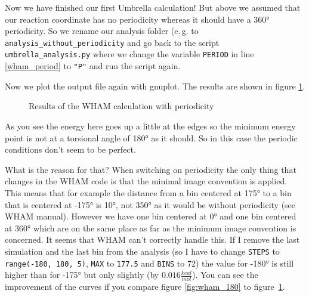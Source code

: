 \documentclass[a4paper,11pt]{scrartcl}
\begin{document}
Now we have finished our first Umbrella calculation! But above we assumed that our reaction coordinate has no periodicity whereas it should have a 360° periodicity. So we rename our analysis folder (e.\,g. to \texttt{analysis\_without\_periodicity} and go back to the script \texttt{umbrella\_analysis.py} where we change the variable \texttt{PERIOD} in line \ref{wham_period} to \texttt{"P"} and run the script again.

Now we plot the output file again with gnuplot. The results are shown in figure \ref{fig:wham_result_period}.

\begin{figure} [htb]
	\caption{Results of the WHAM calculation with periodicity}
	\label{fig:wham_result_period}
\end{figure} 

As you see the energy here goes up a little at the edges so the minimum energy point is not at a torsional angle of 180° as it should. So in this case the periodic conditions don't seem to be perfect.

What is the reason for that? When switching on periodicity the only thing that changes in the WHAM code is that the minimal image convention is applied. This means that for example the distance from a bin centered at 175° to a bin that is centered at -175° is 10°, not 350° as it would be without periodicity (see WHAM manual). However we have one bin centered at 0° and one bin centered at 360° which are on the same place as far as the minimum image convention is concerned. It seems that WHAM can't correctly handle this. If I remove the last simulation and the last bin from the analysis (so I have to change \texttt{STEPS} to \texttt{range(-180, 180, 5)}, \texttt{MAX} to \texttt{177.5} and \texttt{BINS} to 72) the value for -180° is still higher than for -175° but only slightly (by $0.016 \frac{kcal}{mol}$). You can see the improvement of the curves if you compare figure \ref{fig:wham_180} to \mbox{figure \ref{fig:wham_result_period}}.
\end{document}
